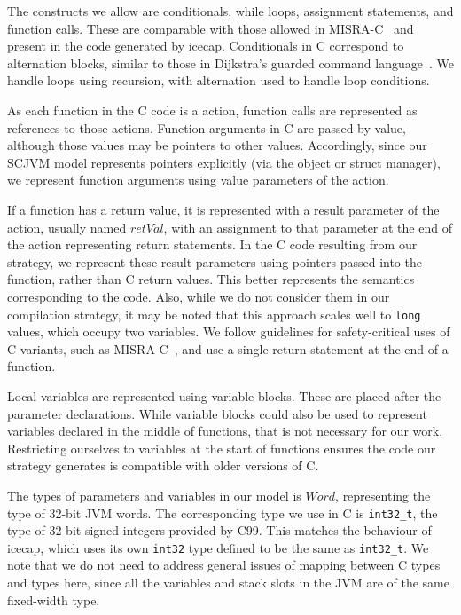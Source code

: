 The constructs we allow are conditionals, while loops, assignment
statements, and function calls.
These are comparable with those allowed in MISRA-C~\cite{MISRA} and
present in the code generated by icecap.
Conditionals in C correspond to \Circus{} alternation blocks, similar
to those in Dijkstra's guarded command language~\cite{dijkstra1975}.
We handle loops using recursion, with alternation used to handle loop
conditions.

As each function in the C code is a \Circus{} action, function calls
are represented as references to those actions.
Function arguments in C are passed by value, although those values may
be pointers to other values.
Accordingly, since our SCJVM model represents pointers explicitly (via
the object or struct manager), we represent function arguments using
value parameters of the \Circus{} action.

If a function has a return value, it is represented with a result
parameter of the \Circus{} action, usually named $retVal$, with an
assignment to that parameter at the end of the action representing
return statements.
In the C code resulting from our strategy, we represent these result
parameters using pointers passed into the function, rather than C
return values.
This better represents the semantics corresponding to the \Circus{}
code.
Also, while we do not consider them in our compilation strategy, it
may be noted that this approach scales well to \texttt{long} values,
which occupy two variables.
We follow guidelines for safety-critical uses of C variants, such as
MISRA-C~\cite{MISRA}, and use a single return statement at the end of
a function.

Local variables are represented using \Circus{} variable blocks.
These are placed after the parameter declarations.
While \Circus{} variable blocks could also be used to represent
variables declared in the middle of functions, that is not necessary
for our work.
Restricting ourselves to variables at the start of functions ensures
the code our strategy generates is compatible with older versions of
C.

The types of parameters and variables in our \Circus{} model is
$Word$, representing the type of 32-bit JVM words.
The corresponding type we use in C is \texttt{int32\_t}, the type of
32-bit signed integers provided by C99.
This matches the behaviour of icecap, which uses its own
\texttt{int32} type defined to be the same as \texttt{int32\_t}.
We note that we do not need to address general issues of mapping
between C types and \Circus{} types here, since all the variables and
stack slots in the JVM are of the same fixed-width type.


